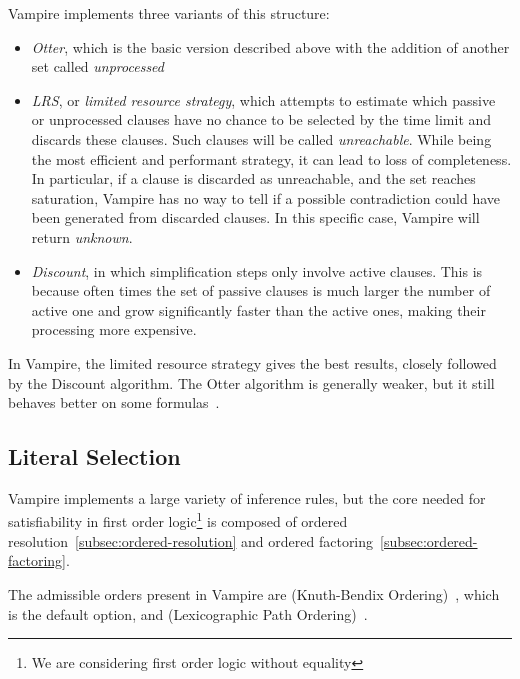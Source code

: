 Vampire implements three variants of this structure:

\begin{itemize}
  \item \emph{Otter}, which is the basic version described above with the addition of another set called \emph{unprocessed}
  \item \emph{LRS}, or \emph{limited resource strategy}, which attempts to estimate which passive or unprocessed clauses have no chance to be selected by the time limit and discards these clauses.
                    Such clauses will be called \emph{unreachable}.
                    While being the most efficient and performant strategy, it can lead to loss of completeness.
                    In particular, if a clause is discarded as unreachable, and the set reaches saturation, Vampire has no way to tell if a possible contradiction could have been generated from discarded clauses.
                    In this specific case, Vampire will return \emph{unknown}.
  \item \emph{Discount}, in which simplification steps only involve active clauses.
                          This is because often times the set of passive clauses is much larger the number of active one and grow significantly faster than the active ones, making their processing more expensive.
\end{itemize}

In Vampire, the limited resource strategy gives the best results, closely followed by the Discount algorithm.
The Otter algorithm is generally weaker, but it still behaves better on some formulas~\cite{kovacs2013vampire}.

\subsection{Literal Selection}\label{subsec:literal-selection}

Vampire implements a large variety of inference rules, but the core needed for satisfiability in first order logic\footnote{
  We are considering first order logic without equality
} is composed of ordered resolution~\ref{subsec:ordered-resolution} and ordered factoring~\ref{subsec:ordered-factoring}.

The admissible orders present in Vampire are  (Knuth-Bendix Ordering)~\cite{knuth1970simple}, which is the default option, and  (Lexicographic Path Ordering)~\cite{dershowitz1982orderings}.

